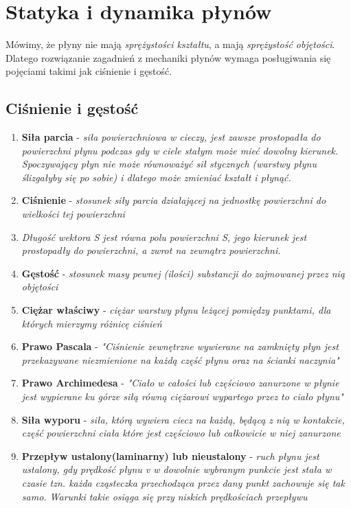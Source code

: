 \documentclass[12pt,twoside,a4paper]{book}
\begin{document}
\chapter{Statyka i dynamika płynów}
Mówimy, że płyny nie mają \textit{sprężystości kształtu}, a mają \textit{sprężystość objętości}. Dlatego rozwiązanie
zagadnień z mechaniki płynów wymaga posługiwania się pojęciami takimi jak ciśnienie i gęstość.
\section{Ciśnienie i gęstość}
\begin{enumerate}[label=(\alph*)]
\item\textbf{Siła parcia} - \textit{siła powierzchniowa w cieczy, jest zawsze prostopadła do powierzchni płynu podczas gdy w ciele stałym może mieć dowolny kierunek. Spoczywający płyn nie może równoważyć sił stycznych (warstwy
płynu ślizgałyby się po sobie) i dlatego może zmieniać kształt i płynąć.}
\item\textbf{Ciśnienie} - \textit{stosunek siły parcia działającej na jednostkę powierzchni
do wielkości tej powierzchni}
\item\textit{Długość wektora S jest równa polu powierzchni S, jego kierunek jest prostopadły do
powierzchni, a zwrot na zewnątrz powierzchni.}
\item\textbf{Gęstość} - \textit{stosunek masy pewnej (ilości) substancji do zajmowanej przez nią objętości}
\item\textbf{Ciężar właściwy} - \textit{ciężar warstwy płynu leżącej pomiędzy punktami, dla których mierzymy różnicę ciśnień}
\item\textbf{Prawo Pascala} - \textit{"Ciśnienie zewnętrzne wywierane na zamknięty płyn jest przekazywane niezmienione
na każdą część płynu oraz na ścianki naczynia"}
\item\textbf{Prawo Archimedesa} - \textit{"Ciało w całości lub częściowo zanurzone w płynie jest wypierane ku górze siłą równą ciężarowi wypartego przez to ciało płynu"}
\item\textbf{Siła wyporu} - \textit{siła, którą wywiera ciecz na każdą, będącą z nią w kontakcie, część powierzchni ciała które jest częściowo lub całkowicie w niej zanurzone}
\item\textbf{Przepływ ustalony(laminarny) lub nieustalony} - \textit{ruch płynu jest
ustalony, gdy prędkość płynu v w dowolnie wybranym punkcie jest stała w czasie tzn.
każda cząsteczka przechodząca przez dany punkt zachowuje się tak samo. Warunki takie
osiąga się przy niskich prędkościach przepływu}

\end{enumerate}
\end{document}
